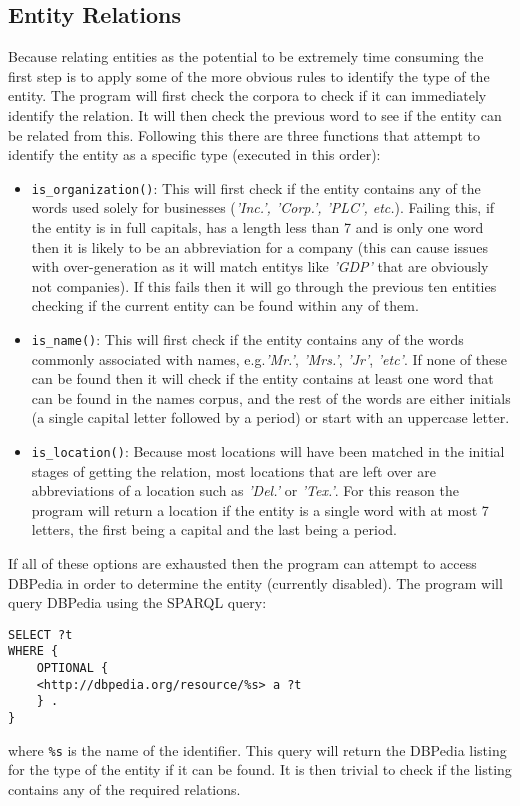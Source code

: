 \documentclass[draft]{article}
\begin{document}
\begin{multicols*}{2}
\section{Entity Relations}
Because relating entities as the potential to be extremely time consuming the first step is to apply some of the more obvious rules to identify the type of the entity. The program will first check the corpora to check if it can immediately identify the relation. It will then check the previous word to see if the entity can be related from this. Following this there are three functions that attempt to identify the entity as a specific type (executed in this order):
\begin{itemize}
\item \texttt{is\_organization()}: This will first check if the entity contains any of the words used solely for businesses (\textit{'Inc.', 'Corp.', 'PLC', etc.}). Failing this, if the entity is in full capitals, has a length less than 7 and is only one word then it is likely to be an abbreviation for a company (this can cause issues with over-generation as it will match entitys like \textit{'GDP'} that are obviously not companies). If this fails then it will go through the previous ten entities checking if the current entity can be found within any of them.
\item \texttt{is\_name()}: This will first check if the entity contains any of the words commonly associated with names, e.g.\textit{'Mr.'}, \textit{'Mrs.'}, \textit{'Jr'}, \textit{'etc'}. If none of these can be found then it will check if the entity contains at least one word that can be found in the names corpus, and the rest of the words are either initials (a single capital letter followed by a period) or start with an uppercase letter.
\item \texttt{is\_location()}: Because most locations will have been matched in the initial stages of getting the relation, most locations that are left over are abbreviations of a location such as \textit{'Del.'} or \textit{'Tex.'}. For this reason the program will return a location if the entity is a single word with at most 7 letters, the first being a capital and the last being a period. 
\end{itemize}

If all of these options are exhausted then the program can attempt to access DBPedia in order to determine the entity (currently disabled). The program will query DBPedia using the SPARQL \citep{SPARQL} query:
\begin{verbatim}
SELECT ?t
WHERE {
	OPTIONAL { 
	<http://dbpedia.org/resource/%s> a ?t 
	} .
}
\end{verbatim}
where \texttt{\%s} is the name of the identifier. This query will return the DBPedia listing for the type of the entity if it can be found. It is then trivial to check if the listing contains any of the required relations. 




\end{multicols*}
\end{document}
